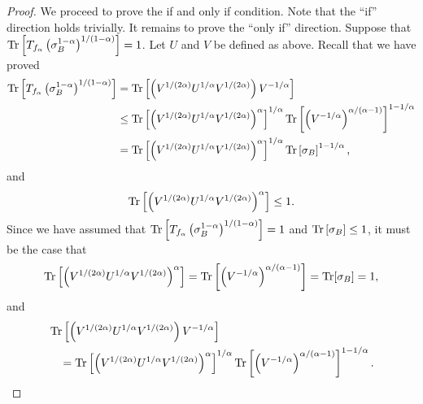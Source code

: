 \documentclass{article}
\begin{document}
\begin{proof}
    We proceed to prove the if and only if condition. 
    Note that the ``if'' direction holds trivially. 
    It remains to prove the ``only if'' direction. 
    Suppose that $\Tr\left[T_{f_{\alpha}}\left(\sigma_B^{1-\alpha}\right)^{1/(1-\alpha)}\right]=1$.
    Let $U$ and $V$ be defined as above. 
    Recall that we have proved
    \begin{align}
        \Tr\left[T_{f_{\alpha}}\left(\sigma_B^{1-\alpha}\right)^{1/(1-\alpha)}\right]
        &= \Tr\left[ \left( V^{ 1/(2\alpha)} U^{ 1/\alpha } V^{ 1/(2\alpha) }\right) V^{ - 1/\alpha } \right]\\
        &\leq\Tr\left[ \left( V^{ 1/(2\alpha) } U^{ 1/\alpha } V^{ 1/(2\alpha) }\right)^\alpha \right]^{ 1/\alpha }  \Tr\left[ \left( V^{ -1/\alpha } \right)^{\alpha/(\alpha-1)} \right]^{ 1- 1/\alpha } \\
        &=\Tr\left[ \left( V^{ 1/(2\alpha) } U^{ 1/\alpha } V^{ 1/(2\alpha) }\right)^\alpha \right]^{ 1/\alpha }  \Tr\left[ \sigma_B \right]^{ 1- 1/\alpha },
    \end{align}
    and
    \begin{align}
        \Tr\left[ \left( V^{ 1/(2\alpha) } U^{ 1/\alpha } V^{ 1/(2\alpha) }\right)^\alpha \right]\leq 1.
    \end{align}
    Since we have assumed that $\Tr\left[T_{f_{\alpha}}\left(\sigma_B^{1-\alpha}\right)^{1/(1-\alpha)}\right]=1$ and $\Tr\left[ \sigma_B \right]\leq 1$,
    it must be the case that
    \begin{align}
        \Tr\left[ \left( V^{ 1/(2\alpha) } U^{ 1/\alpha } V^{ 1/(2\alpha) }\right)^\alpha \right]
        =\Tr\left[ \left( V^{ -1/\alpha } \right)^{\alpha/(\alpha-1)} \right]
        =\Tr[\sigma_B]
        =1,
    \end{align}
    and
    \begin{align}
        &\Tr\left[ \left( V^{ 1/(2\alpha)} U^{ 1/\alpha } V^{ 1/(2\alpha) }\right) V^{ - 1/\alpha } \right]\\
        &\quad=\Tr\left[ \left( V^{ 1/(2\alpha) } U^{ 1/\alpha } V^{ 1/(2\alpha) }\right)^\alpha \right]^{ 1/\alpha }  \Tr\left[ \left( V^{ -1/\alpha } \right)^{\alpha/(\alpha-1)} \right]^{ 1- 1/\alpha }.
    \end{align}    

\end{proof}
\end{document}
